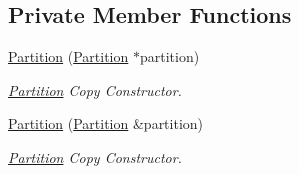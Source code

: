 \subsection*{Private Member Functions}
\begin{DoxyCompactItemize}
\item 
\mbox{\hyperlink{classlogic_1_1_partition_acb291b3b0ccf48005e141be32fdd7efd}{Partition}} (\mbox{\hyperlink{classlogic_1_1_partition}{Partition}} $\ast$partition)
\begin{DoxyCompactList}\small\item\em \mbox{\hyperlink{classlogic_1_1_partition}{Partition}} Copy Constructor. \end{DoxyCompactList}\item 
\mbox{\hyperlink{classlogic_1_1_partition_a019dc9e3d0c13954cd5d72f2049f21fd}{Partition}} (\mbox{\hyperlink{classlogic_1_1_partition}{Partition}} \&partition)
\begin{DoxyCompactList}\small\item\em \mbox{\hyperlink{classlogic_1_1_partition}{Partition}} Copy Constructor. \end{DoxyCompactList}\end{DoxyCompactItemize}
